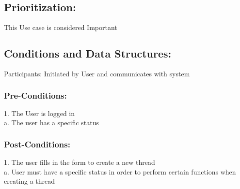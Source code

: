 \documentclass[a4paper,11pt]{article}
\begin{document}
\subsection{Prioritization:} 
This Use case is considered Important
\subsection{Conditions and Data Structures:}
Participants:
Initiated by User and communicates with system
\subsubsection*{Pre-Conditions:}
1.	The User is logged in \\
a.	The user has a specific status
\subsubsection*{Post-Conditions:}
1.	The user fills in the form to create a new thread\\
a.	User must have a specific status in order to perform certain functions when creating a thread
\end{document}
